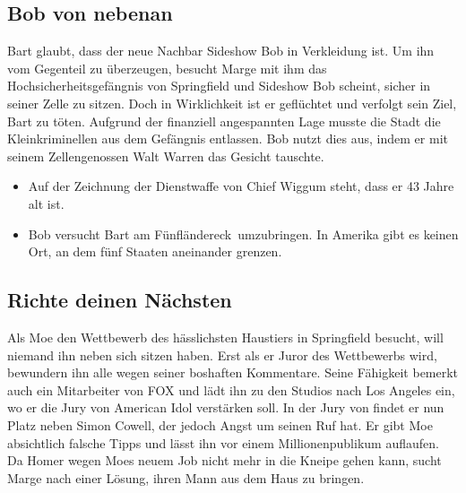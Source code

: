 
\subsection{Bob von nebenan}
Bart glaubt, dass der neue Nachbar Sideshow Bob in Verkleidung ist. Um ihn vom Gegenteil zu überzeugen, besucht Marge mit ihm das Hochsicherheitsgefängnis von Springfield und Sideshow Bob scheint, sicher in seiner Zelle zu sitzen. Doch in Wirklichkeit ist er geflüchtet und verfolgt sein Ziel, Bart zu töten. Aufgrund der finanziell angespannten Lage musste die Stadt die Kleinkriminellen aus dem Gefängnis entlassen. Bob nutzt dies aus, indem er mit seinem Zellengenossen Walt Warren das Gesicht tauschte.

\begin{itemize}
	\item Auf der Zeichnung der Dienstwaffe von Chief Wiggum steht, dass er 43 Jahre alt ist.
	\item Bob versucht Bart am \glqq Fünfländereck\grqq\ umzubringen. In Amerika gibt es keinen Ort, an dem fünf Staaten aneinander grenzen.
\end{itemize}

\subsection{Richte deinen Nächsten}
Als Moe den Wettbewerb des hässlichsten Haustiers in Springfield besucht, will niemand ihn neben sich sitzen haben. Erst als er Juror des Wettbewerbs wird, bewundern ihn alle wegen seiner boshaften Kommentare. Seine Fähigkeit bemerkt auch ein Mitarbeiter von FOX und lädt ihn zu den Studios nach Los Angeles ein, wo er die Jury von American Idol verstärken soll. In der Jury von findet er nun Platz neben Simon Cowell, der jedoch Angst um seinen Ruf hat. Er gibt Moe absichtlich falsche Tipps und lässt ihn vor einem Millionenpublikum auflaufen. Da Homer wegen Moes neuem Job nicht mehr in die Kneipe gehen kann, sucht Marge nach einer Lösung, ihren Mann aus dem Haus zu bringen.

